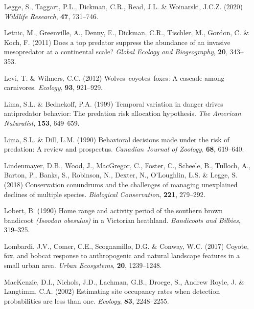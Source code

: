 \documentclass[11pt,a4paper,titlepage,twoside,openright]{style/unimelbthesis}
\begin{document}
\begin{mainmatter}
\leavevmode\hypertarget{ref-legge2020cat}{}%
Legge, S., Taggart, P.L., Dickman, C.R., Read, J.L. \& Woinarski, J.C.Z. (2020) \emph{Wildlife Research}, \textbf{47}, 731--746.

\leavevmode\hypertarget{ref-letnic2011does}{}%
Letnic, M., Greenville, A., Denny, E., Dickman, C.R., Tischler, M., Gordon, C. \& Koch, F. (2011) Does a top predator suppress the abundance of an invasive mesopredator at a continental scale? \emph{Global Ecology and Biogeography}, \textbf{20}, 343--353.

\leavevmode\hypertarget{ref-levi2012wolves}{}%
Levi, T. \& Wilmers, C.C. (2012) Wolves--coyotes--foxes: A cascade among carnivores. \emph{Ecology}, \textbf{93}, 921--929.

\leavevmode\hypertarget{ref-lima1999temporal}{}%
Lima, S.L. \& Bednekoff, P.A. (1999) Temporal variation in danger drives antipredator behavior: The predation risk allocation hypothesis. \emph{The American Naturalist}, \textbf{153}, 649--659.

\leavevmode\hypertarget{ref-lima1990behavioral}{}%
Lima, S.L. \& Dill, L.M. (1990) Behavioral decisions made under the risk of predation: A review and prospectus. \emph{Canadian Journal of Zoology}, \textbf{68}, 619--640.

\leavevmode\hypertarget{ref-lindenmayer2018conservation}{}%
Lindenmayer, D.B., Wood, J., MacGregor, C., Foster, C., Scheele, B., Tulloch, A., Barton, P., Banks, S., Robinson, N., Dexter, N., O'Loughlin, L.S. \& Legge, S. (2018) Conservation conundrums and the challenges of managing unexplained declines of multiple species. \emph{Biological Conservation}, \textbf{221}, 279--292.

\leavevmode\hypertarget{ref-lobert1990home}{}%
Lobert, B. (1990) Home range and activity period of the southern brown bandicoot \emph{(Isoodon obesulus)} in a Victorian heathland. \emph{Bandicoots and Bilbies}, 319--325.

\leavevmode\hypertarget{ref-lombardi2017coyote}{}%
Lombardi, J.V., Comer, C.E., Scognamillo, D.G. \& Conway, W.C. (2017) Coyote, fox, and bobcat response to anthropogenic and natural landscape features in a small urban area. \emph{Urban Ecosystems}, \textbf{20}, 1239--1248.

\leavevmode\hypertarget{ref-mackenzie2002estimating}{}%
MacKenzie, D.I., Nichols, J.D., Lachman, G.B., Droege, S., Andrew Royle, J. \& Langtimm, C.A. (2002) Estimating site occupancy rates when detection probabilities are less than one. \emph{Ecology}, \textbf{83}, 2248--2255.


\end{mainmatter}
\end{document}
